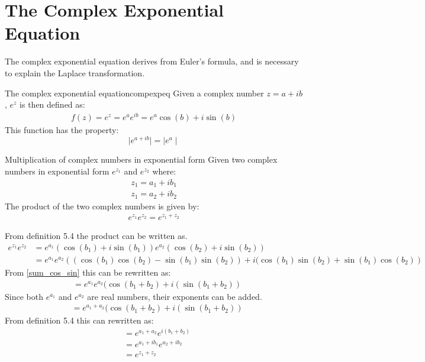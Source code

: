 \section{The Complex Exponential Equation}
The complex exponential equation derives from Euler’s formula, and is necessary to explain the Laplace transformation. \\

\begin{definition}{The complex exponential equation}{compexpeq}
Given a complex number $z=a+ib$, $e^{z}$ is then defined as:
\begin{align*}
f(z)=e^z=e^ae^{ib}=e^a\cos(b)+i\sin(b)
\end{align*}
This function has the property:
$$\mid e^{a+ib} \mid = \mid e^a \mid$$
\end{definition}
\begin{theorem}{Multiplication of complex numbers in exponential form}{}
Given two complex numbers in exponential form $e^{z_1}$ and $e^{z_2}$ where:
\begin{align*}
z_1=a_1+ib_1
\\
z_1=a_2+ib_2
\end{align*}
The product of the two complex numbers is given by:
\begin{align}
e^{z_1}e^{z_2}=e^{z_1+z_2}
\end{align}
\end{theorem}
\begin{prof}{}{}
From definition 5.4 %
the product can be written as.
\begin{align*}
e^{z_1}e^{z_2}&=e^{a_1}(\cos(b_1)+i\sin(b_1))e^{a_2}(\cos(b_2)+i\sin(b_2))
\\
&=e^{a_1}e^{a_2}\left( (\cos(b_1)\cos(b_2)-\sin(b_1) \sin(b_2))+i(\cos(b_1)\sin(b_2)+\sin(b_1)\cos(b_2)\right)
\end{align*}
From \eqref{sum_cos_sin} this can be rewritten as:
\begin{align*}
&=e^{a_1}e^{a_2}(\cos(b_1+b_2)+i(\sin(b_1+b_2))
\end{align*}
Since both $e^{a_1}$ and $e^{a_2}$ are real numbers, their exponents can be added.
\begin{align*}
&=e^{a_1+a_2}(\cos(b_1+b_2)+i(\sin(b_1+b_2))
\end{align*}
From definition 5.4 %
this can rewritten as:
\begin{align*}
&=e^{a_1+a_2}e^{i(b_1+b_2)}
\\
&=e^{a_1+ib_1}e^{a_2+ib_2}
\\
&=e^{z_1+z_2}
\end{align*} 
\end{prof}
